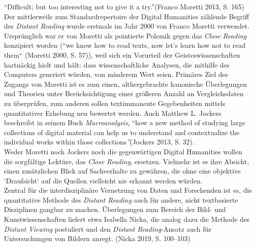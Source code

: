 \documentclass{article}
\begin{document}
    “Difficult; but too interesting not to give it a try.”(Franco Moretti 2013,
                     S. 165)\\
            
        Der mittlerweile zum Standard­repertoire der Digital Humanities zählende Begriff
                  des \emph{Distant Reading} wurde erstmals im Jahr 2000 von Franco
                  Moretti verwendet. Ursprünglich war er von Moretti als pointierte Polemik gegen
                  das \emph{Close Reading} konzipiert worden (“we know how to read
                  texts, now let’s learn how not to read them“ (Moretti 2000, S. 57)),
                  weil sich ein Vorurteil der Geistes­wissenschaften hartnäckig hielt und hält: dass
                  wissenschaftliche Analy­sen, die mithilfe des Computers generiert würden, von
                  minderem Wert seien. Primäres Ziel des Zugangs von Moretti ist es zum einen,
                  althergebrachte kanonische Überlegungen und Theorien unter Berücksichtigung einer
                  größeren Anzahl an Vergleichsdaten zu überprüfen, zum anderen sollen textimmanente
                  Gegebenheiten mittels quantitativer Erhebung neu bewertet werden. Auch Matthew L.
                  Jockers beschreibt in seinem Buch \emph{Macroanalysis}, “how a new
                  method of studying large collections of digital material can help us to understand
                  and contextualize the individual works within those collections\emph{”}(Jockers 2013, S. 32).\\
            
        Weder Moretti noch Jockers noch die gegenwärtigen Digital Humanities wollen die
                  sorgfältige Lektüre, das \emph{Close Reading}, ersetzen. Vielmehr
                  ist es ihre Absicht, einen zusätzlichen Blick auf Sachverhalte zu gewähren, die
                  ohne eine objektive ‘Draufsicht‘ auf die Quellen vielleicht nie erkannt werden
                  wür­den.\\
            
        Zentral für die interdisziplinäre Vernetzung von Daten und Forschenden ist es, die
                  quantitative Methode des \emph{Distant Reading} auch für andere,
                  nicht textbasierte Disziplinen gangbar zu machen. Überlegungen zum Bereich der
                  Bild- und Kunstwissenschaften liefert etwa Isabella Nicka, die analog dazu die
                  Methode des \emph{Distant Viewing} postuliert und den \emph{Distant Reading}-Ansatz auch für Untersuchungen von Bildern
                  anregt. (Nicka 2019, S. 100–103)\\
            
\end{document}
